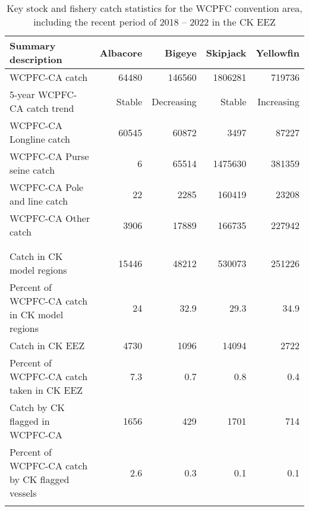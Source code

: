 \begin{longtable}{lrrrr}
\caption{Key stock and fishery catch statistics for the WCPFC convention area, including the recent period of 2018 -- 2022 in the CK EEZ} \\ 
  \hline
Summary description & Albacore & Bigeye & Skipjack & Yellowfin \\ 
  \hline
WCPFC-CA catch & 64480 & 146560 & 1806281 & 719736 \\ 
  5-year WCPFC-CA catch trend & Stable & Decreasing & Stable & Increasing \\ 
  WCPFC-CA Longline catch & 60545 & 60872 & 3497 & 87227 \\ 
  WCPFC-CA Purse seine catch & 6 & 65514 & 1475630 & 381359 \\ 
  WCPFC-CA Pole and line catch & 22 & 2285 & 160419 & 23208 \\ 
  WCPFC-CA Other catch & 3906 & 17889 & 166735 & 227942 \\ 
   &  &  &  &  \\ 
   \hline
 &  &  &  &  \\ 
  Catch in CK model regions & 15446 & 48212 & 530073 & 251226 \\ 
  Percent of WCPFC-CA catch in CK model regions & 24 & 32.9 & 29.3 & 34.9 \\ 
  Catch in CK EEZ & 4730 & 1096 & 14094 & 2722 \\ 
  Percent of WCPFC-CA catch taken in CK EEZ & 7.3 & 0.7 & 0.8 & 0.4 \\ 
  Catch by CK flagged in WCPFC-CA & 1656 & 429 & 1701 & 714 \\ 
  Percent of WCPFC-CA catch by CK flagged vessels & 2.6 & 0.3 & 0.1 & 0.1 \\ 
  \hline
\label{cat_sum_tab}
\end{longtable}

